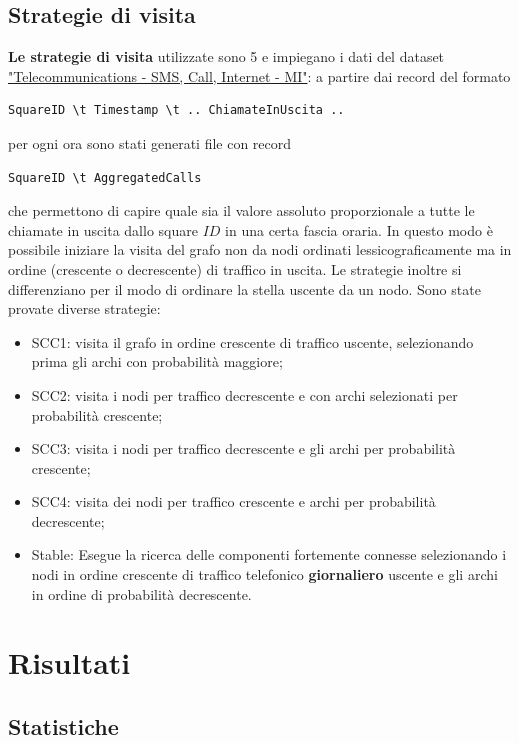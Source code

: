\documentclass[10pt,a4paper]{article}
\begin{document}
\subsection{Strategie di visita}
\textbf{Le strategie di visita} utilizzate sono 5 e impiegano i dati del dataset 
\href{https://dandelion.eu/datagem/telecom-sms-call-internet-mi/description/}{"Telecommunications - SMS, Call, Internet - MI"}:
a partire dai record del formato
\begin{verbatim}
SquareID \t Timestamp \t .. ChiamateInUscita ..
\end{verbatim}
per ogni ora sono stati generati file con record
\begin{verbatim}
SquareID \t AggregatedCalls
\end{verbatim}
che permettono di capire quale sia il valore assoluto proporzionale a tutte le chiamate in uscita dallo square
$ID$ in una certa fascia oraria.
In questo modo è possibile iniziare la visita del grafo non da nodi ordinati lessicograficamente ma in ordine
(crescente o decrescente) di traffico in uscita.
Le strategie inoltre si differenziano per il modo di ordinare la stella uscente da un nodo.
Sono state provate diverse strategie:

\begin{itemize}
\item SCC1: visita il grafo in ordine crescente di traffico uscente,
selezionando prima gli archi con probabilità maggiore;
\item SCC2: visita i nodi per traffico decrescente e con archi selezionati per probabilità crescente;
\item SCC3: visita i nodi per traffico decrescente e gli archi per probabilità crescente;
\item SCC4: visita dei nodi per traffico crescente e archi per probabilità decrescente;
\item Stable: Esegue la ricerca delle componenti fortemente connesse selezionando i nodi in ordine crescente di traffico telefonico \textbf{giornaliero} uscente e gli archi in ordine di probabilità decrescente.
\end{itemize}
 
\section{Risultati}

\subsection{Statistiche}
\end{document}
